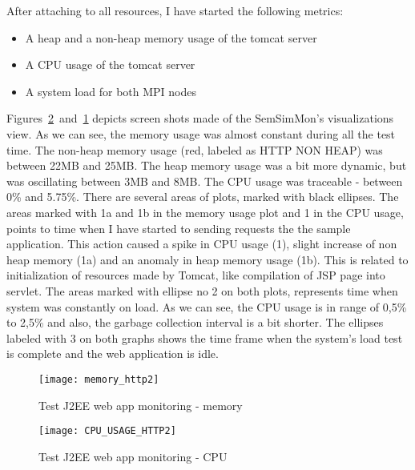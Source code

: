 After attaching to all resources, I have started the following metrics:

\begin{itemize}
\item A heap and a non-heap memory usage of the tomcat server
\item A CPU usage of the tomcat server
\item A system load for both MPI nodes
\end{itemize}

Figures~\ref{fig:http_cpu}~and~\ref{fig:http_memory} depicts screen shots made of the SemSimMon\rq{}s visualizations view. As we can see, the memory usage was almost constant during all the test time. The non-heap memory usage (red, labeled as HTTP NON HEAP) was between 22MB and 25MB. The heap memory usage was a bit more dynamic, but was oscillating between 3MB and 8MB. The CPU usage was traceable - between 0\% and 5.75\%. There are several areas of plots, marked with black ellipses. The areas marked with 1a and 1b in the memory usage plot and 1 in the CPU usage, points to time when I have started to sending requests the the sample application. This action caused a spike in CPU usage (1), slight increase of non heap memory (1a) and an anomaly in heap memory usage (1b). This is related to initialization of resources made by Tomcat, like compilation of JSP page into servlet. The areas marked with ellipse no 2 on both plots, represents time when system was constantly on load. As we can see, the CPU usage is in range of 0,5\% to 2,5\% and also, the garbage collection interval is a bit shorter. The ellipses labeled with 3 on both graphs shows the time frame when the system\rq{}s load test is complete and the web application is idle.

\begin{figure}[ht]
\centering
\texttt{[image: memory\_http2]}
\caption{Test J2EE web app monitoring - memory}
\label{fig:http_memory}
\end{figure}

\begin{figure}[ht]
\centering
\texttt{[image: CPU\_USAGE\_HTTP2]}
\caption{Test J2EE web app monitoring - CPU}
\label{fig:http_cpu}
\end{figure}


